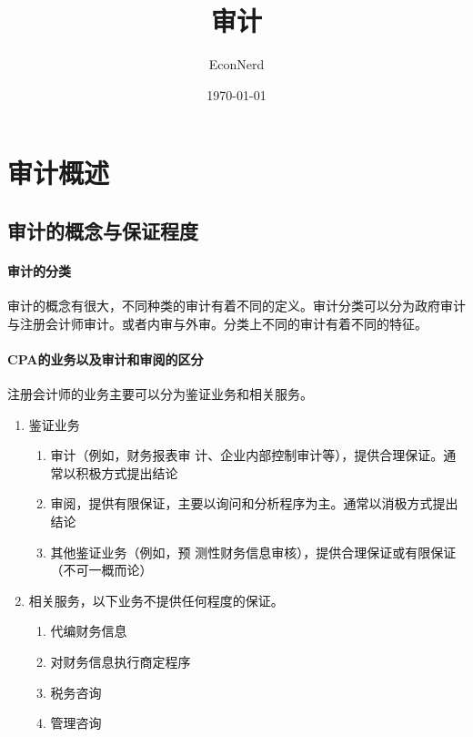\documentclass[UTF8,12pt]{ctexart}
\title{审计} %
\author{EconNerd}
\date{\today}
\numberwithin{equation}{section} %
\numberwithin{figure}{section}
\numberwithin{table}{section}
\begin{document}
	\maketitle
	\tableofcontents
	\newpage

	\section{审计概述}
	\subsection{审计的概念与保证程度}
	\paragraph{审计的分类}审计的概念有很大，不同种类的审计有着不同的定义。审计分类可以分为政府审计与注册会计师审计。或者内审与外审。分类上不同的审计有着不同的特征。
	
	\paragraph{CPA的业务以及审计和审阅的区分}注册会计师的业务主要可以分为鉴证业务和相关服务。
	\begin{enumerate}
		\item 鉴证业务
		\begin{enumerate}
			\item 审计（例如，财务报表审
			计、企业内部控制审计等），提供合理保证。通常以积极方式提出结论
			
			\item 审阅，提供有限保证，主要以询问和分析程序为主。通常以消极方式提出结论
			
			\item 其他鉴证业务（例如，预
			测性财务信息审核），提供合理保证或有限保证
			（不可一概而论）
		\end{enumerate}
		
		\item 相关服务，以下业务不提供任何程度的保证。
		\begin{enumerate}
			\item 代编财务信息
			
			\item 对财务信息执行商定程序
			
			\item 税务咨询
			
			\item 管理咨询
		\end{enumerate}
	\end{enumerate}
	
\end{document}
